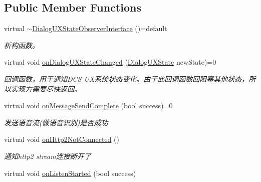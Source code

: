 \subsection*{Public Member Functions}
\begin{DoxyCompactItemize}
\item 
\mbox{\label{classduerOSDcsSDK_1_1sdkInterfaces_1_1DialogUXStateObserverInterface_a35c278a6bbec5a99f727adf843b1f6ca}} 
virtual \hyperlink{classduerOSDcsSDK_1_1sdkInterfaces_1_1DialogUXStateObserverInterface_a35c278a6bbec5a99f727adf843b1f6ca}{$\sim$\+Dialog\+U\+X\+State\+Observer\+Interface} ()=default
\begin{DoxyCompactList}\small\item\em 析构函数。 \end{DoxyCompactList}\item 
virtual void \hyperlink{classduerOSDcsSDK_1_1sdkInterfaces_1_1DialogUXStateObserverInterface_a637d0af6797816b4e5cd72198e3f3781}{on\+Dialog\+U\+X\+State\+Changed} (\hyperlink{classduerOSDcsSDK_1_1sdkInterfaces_1_1DialogUXStateObserverInterface_abbcd31d45f9112289ba73c574bf191cd}{Dialog\+U\+X\+State} new\+State)=0
\begin{DoxyCompactList}\small\item\em 回调函数，用于通知\+D\+CS U\+X系统状态变化。由于此回调函数回阻塞其他状态，所以实现方需要尽快返回。 \end{DoxyCompactList}\item 
virtual void \hyperlink{classduerOSDcsSDK_1_1sdkInterfaces_1_1DialogUXStateObserverInterface_ae7aeb5e14429beb2de4f39343e212454}{on\+Message\+Send\+Complete} (bool success)=0
\begin{DoxyCompactList}\small\item\em 发送语音流(做语音识别)是否成功 \end{DoxyCompactList}\item 
virtual void \hyperlink{classduerOSDcsSDK_1_1sdkInterfaces_1_1DialogUXStateObserverInterface_a444993d3b7cf37527bb2201659215094}{on\+Http2\+Not\+Connected} ()
\begin{DoxyCompactList}\small\item\em 通知http2 stream连接断开了 \end{DoxyCompactList}\item 
virtual void \hyperlink{classduerOSDcsSDK_1_1sdkInterfaces_1_1DialogUXStateObserverInterface_aa2696e09b8315aebb1a5a22a954c0131}{on\+Listen\+Started} (bool success)

\end{DoxyCompactItemize}
